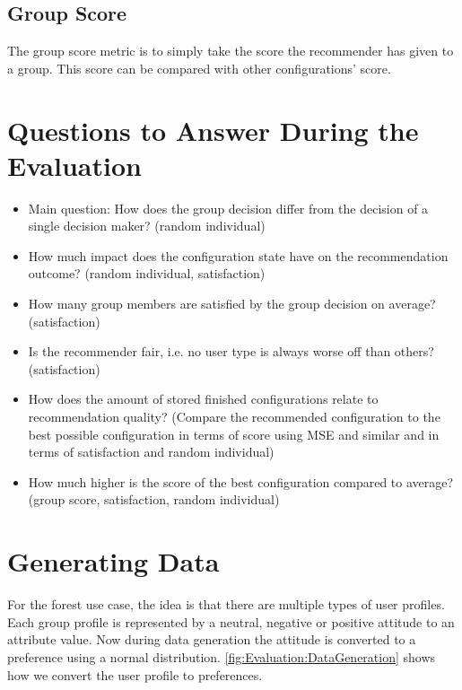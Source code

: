 \subsection{Group Score}
The group score metric is to simply take the score the recommender has given to a group. This score can be compared with other configurations' score.


\section{Questions to Answer During the Evaluation}
\label{sec:Evaluation:Questions}

\begin{itemize}
    \item Main question: How does the group decision differ from the decision of a single decision maker? (random individual)
    \item How much impact does the configuration state have on the recommendation outcome? (random individual, satisfaction)
    \item How many group members are satisfied by the group decision on average? (satisfaction)
    \item Is the recommender fair, i.e. no user type is always worse off than others? (satisfaction)
    \item How does the amount of stored finished configurations relate to recommendation quality? (Compare the recommended configuration to the best possible configuration in terms of score using MSE and similar and in terms of satisfaction and random individual) 
    \item How much higher is the score of the best configuration compared to average? (group score, satisfaction, random individual)
\end{itemize}

\section{Generating Data}
\label{sec:Evaluation:GeneratingGroups}

For the forest use case, the idea is that there are multiple types of user profiles. Each group profile is represented by a neutral, negative or positive attitude to an attribute value. Now during data generation the attitude is converted to a preference using a normal distribution. \autoref{fig:Evaluation:DataGeneration} shows how we convert the user profile to preferences.

